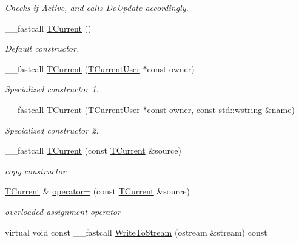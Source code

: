\begin{DoxyCompactItemize}
\begin{DoxyCompactList}\small\item\em Checks if Active, and calls Do\+Update accordingly. \end{DoxyCompactList}\item 
\hypertarget{class_t_current_a90a256bc0bc0a5cd2411a2e4fa3863d0}{\+\_\+\+\_\+fastcall \hyperlink{class_t_current_a90a256bc0bc0a5cd2411a2e4fa3863d0}{T\+Current} ()}\label{class_t_current_a90a256bc0bc0a5cd2411a2e4fa3863d0}

\begin{DoxyCompactList}\small\item\em Default constructor. \end{DoxyCompactList}\item 
\+\_\+\+\_\+fastcall \hyperlink{class_t_current_a162cdbe72be968f6dbff36bfb2643698}{T\+Current} (\hyperlink{class_t_current_user}{T\+Current\+User} $\ast$const owner)
\begin{DoxyCompactList}\small\item\em Specialized constructor 1. \end{DoxyCompactList}\item 
\+\_\+\+\_\+fastcall \hyperlink{class_t_current_abd0a72489ac0f717ad9e19a75e853070}{T\+Current} (\hyperlink{class_t_current_user}{T\+Current\+User} $\ast$const owner, const std\+::wstring \&name)
\begin{DoxyCompactList}\small\item\em Specialized constructor 2. \end{DoxyCompactList}\item 
\hypertarget{class_t_current_a572a41bebba6b97202060f8e2dddc33d}{\+\_\+\+\_\+fastcall \hyperlink{class_t_current_a572a41bebba6b97202060f8e2dddc33d}{T\+Current} (const \hyperlink{class_t_current}{T\+Current} \&source)}\label{class_t_current_a572a41bebba6b97202060f8e2dddc33d}

\begin{DoxyCompactList}\small\item\em copy constructor \end{DoxyCompactList}\item 
\hypertarget{class_t_current_ad4e0c2e5b10357c4437860aa3d45603d}{\hyperlink{class_t_current}{T\+Current} \& \hyperlink{class_t_current_ad4e0c2e5b10357c4437860aa3d45603d}{operator=} (const \hyperlink{class_t_current}{T\+Current} \&source)}\label{class_t_current_ad4e0c2e5b10357c4437860aa3d45603d}

\begin{DoxyCompactList}\small\item\em overloaded assignment operator \end{DoxyCompactList}\item 
\hypertarget{class_t_current_a891b889e072fe9fba8862fc342171af7}{virtual void const \+\_\+\+\_\+fastcall \hyperlink{class_t_current_a891b889e072fe9fba8862fc342171af7}{Write\+To\+Stream} (ostream \&stream) const }\label{class_t_current_a891b889e072fe9fba8862fc342171af7}


\end{DoxyCompactItemize}
